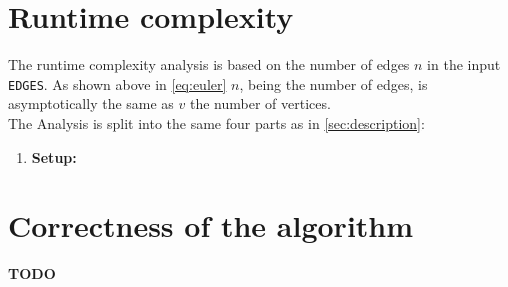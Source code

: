 \documentclass[english]{scrartcl}
\newcommand{\code}{\texttt}
\begin{document}
\section{Runtime complexity}
\label{sec:runtime_comp}
The runtime complexity analysis is based on the number of edges $n$ in the input \code{EDGES}. As shown above in \autoref{eq:euler} $n$, being the number of edges, is asymptotically the same as $v$ the number of vertices.\\
The Analysis is split into the same four parts as in \autoref{sec:description}:
\begin{enumerate}
    \item \textbf{Setup:} 
\end{enumerate}
\section{Correctness of the algorithm}
\label{sec:correctness}
\textbf{TODO}




\clearpage


\end{document}
